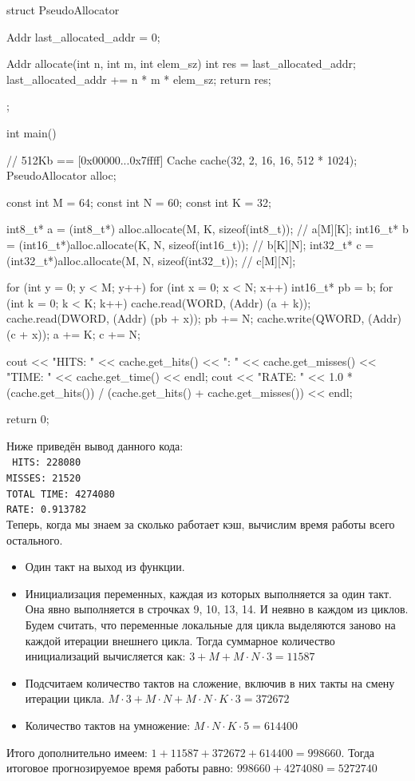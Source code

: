 \documentclass[14pt, russian, onesize]{extreport}
\begin{document}
\begin{cppcode}
struct PseudoAllocator {
    Addr last_allocated_addr = 0;
    
    Addr allocate(int n, int m, int elem_sz) {
        int res = last_allocated_addr;
        last_allocated_addr += n * m * elem_sz;
        return res;
    }
};

int main() {
    // 512Kb == [0x00000...0x7ffff]
    Cache cache(32, 2, 16, 16, 512 * 1024);
    PseudoAllocator alloc;

    const int M = 64;
    const int N = 60;
    const int K = 32;

    int8_t*  a = (int8_t*) alloc.allocate(M, K, sizeof(int8_t));  // a[M][K];
    int16_t* b = (int16_t*)alloc.allocate(K, N, sizeof(int16_t)); // b[K][N];
    int32_t* c = (int32_t*)alloc.allocate(M, N, sizeof(int32_t)); // c[M][N];

    for (int y = 0; y < M; y++) {
        for (int x = 0; x < N; x++) {
            int16_t* pb = b;
            for (int k = 0; k < K; k++) {
                cache.read(WORD, (Addr) (a + k));
                cache.read(DWORD, (Addr) (pb + x));
                pb += N;
            }
            cache.write(QWORD, (Addr) (c + x));
        }
        a += K;
        c += N;
    }

    cout << "HITS: " << cache.get_hits() << "\nMISSES: " << cache.get_misses() << "\nTOTAL TIME: " << cache.get_time() << endl;
    cout << "RATE: " << 1.0 * (cache.get_hits()) / (cache.get_hits() + cache.get_misses()) << endl;

    return 0;
}
\end{cppcode}
Ниже приведён вывод данного кода:\\
\texttt{
HITS: 228080\\
MISSES: 21520\\
TOTAL TIME: 4274080\\
RATE: 0.913782\\
}
Теперь, когда мы знаем за сколько работает кэш, вычислим время
работы всего остального. 
\begin{itemize}
    \item 
        Один такт на выход из функции.
    \item 
        Инициализация переменных, каждая из которых выполняется
        за один такт. Она явно выполняется в строчках 9, 10, 13, 14. 
        И неявно в каждом из циклов. Будем считать, что переменные локальные
        для цикла выделяются заново на каждой итерации внешнего цикла.
        Тогда суммарное количество инициализаций вычисляется как: 
        $3 + M + M \cdot N \cdot 3 = 11587$ 
    \item 
        Подсчитаем количество тактов на сложение, включив в них
        такты на смену итерации цикла. 
        $M \cdot 3+ M \cdot N + M \cdot N \cdot K \cdot 3 = 372672$
    \item 
        Количество тактов на умножение: 
        $M \cdot N \cdot K \cdot 5 = 614400$ 
\end{itemize}
Итого дополнительно имеем: $1 + 11587 + 372672 + 614400 = 998660$.
Тогда итоговое прогнозируемое время работы равно:
$998660 + 4274080 = 5272740$
\end{document}
